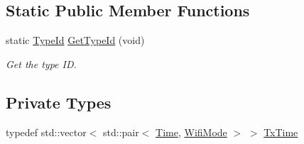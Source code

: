 \subsection*{Static Public Member Functions}
\begin{DoxyCompactItemize}
\item 
static \hyperlink{classns3_1_1TypeId}{Type\+Id} \hyperlink{classns3_1_1RraaWifiManager_a1a909e66dec589bfbcd3f4a7df375663}{Get\+Type\+Id} (void)
\begin{DoxyCompactList}\small\item\em Get the type ID. \end{DoxyCompactList}\end{DoxyCompactItemize}
\subsection*{Private Types}
\begin{DoxyCompactItemize}
\item 
typedef std\+::vector$<$ std\+::pair$<$ \hyperlink{classns3_1_1Time}{Time}, \hyperlink{classns3_1_1WifiMode}{Wifi\+Mode} $>$ $>$ \hyperlink{classns3_1_1RraaWifiManager_aa37f727b4afc496e624c72c43afc36bf}{Tx\+Time}
\end{DoxyCompactItemize}
